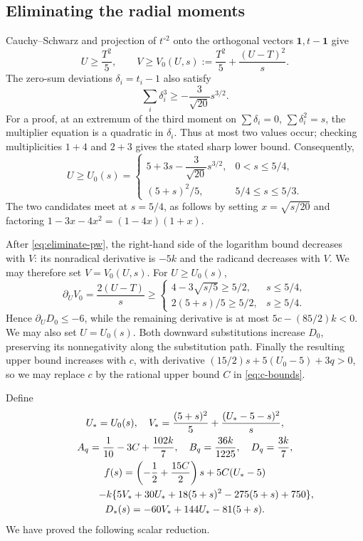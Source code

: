 \documentclass[11pt]{article}
\theoremstyle{remark}
\newcommand{\one}{\mathbf 1}
\numberwithin{equation}{section}
\begin{document}
\subsection{Eliminating the radial moments}
Cauchy--Schwarz and projection of $t^{\circ2}$ onto the orthogonal
vectors $\one,t-\one$ give
\begin{equation}\label{eq:UV}
 U\ge\frac{T^2}{5},\qquad
 V\ge V_0(U,s):=\frac{T^2}{5}+\frac{(U-T)^2}{s}.
\end{equation}
The zero-sum deviations $\delta_i=t_i-1$ also satisfy
\[
 \sum_i\delta_i^3\ge-\frac3{\sqrt{20}}s^{3/2}.
\]
For a proof, at an extremum of the third moment on
$\sum\delta_i=0$, $\sum\delta_i^2=s$, the multiplier equation is a
quadratic in $\delta_i$. Thus at most two values occur; checking
multiplicities $1+4$ and $2+3$ gives the stated sharp lower bound.
Consequently,
\begin{equation}\label{eq:U0}
 U\ge U_0(s)=
 \begin{cases}
 5+3s-\dfrac3{\sqrt{20}}s^{3/2},&0<s\le5/4,\\[2pt]
 (5+s)^2/5,&5/4\le s\le5/3.
 \end{cases}
\end{equation}
The two candidates meet at $s=5/4$, as follows by setting
$x=\sqrt{s/20}$ and factoring
$1-3x-4x^2=(1-4x)(1+x)$.

After \eqref{eq:eliminate-pw}, the right-hand side of the logarithm
bound decreases with $V$: its nonradical derivative is $-5k$ and
the radicand decreases with $V$.
We may therefore set $V=V_0(U,s)$.
For $U\ge U_0(s)$,
\[
 \partial_U V_0=\frac{2(U-T)}s
 \ge\begin{cases}
 4-3\sqrt{s/5}\ge5/2,&s\le5/4,\\
 2(5+s)/5\ge5/2,&s\ge5/4.
 \end{cases}
\]
Hence $\partial_U D_0\le-6$, while the remaining derivative is at most
$5c-(85/2)k<0$. We may also set $U=U_0(s)$.
Both downward substitutions increase $D_0$, preserving its
nonnegativity along the substitution path.
Finally the resulting upper bound increases with $c$, with derivative
$(15/2)s+5(U_0-5)+3q>0$, so we may replace $c$ by the rational upper
bound $C$ in \eqref{eq:c-bounds}.

Define
\begin{equation}\label{eq:scalar-definitions}
\begin{gathered}
 U_*=U_0(s),\quad V_*=\frac{(5+s)^2}{5}
                  +\frac{(U_*-5-s)^2}{s},\\
 A_q=\frac1{10}-3C+\frac{102k}{7},\quad
 B_q=\frac{36k}{1225},\quad D_q=\frac{3k}{7},\\
 f(s)=\left(-\frac12+\frac{15C}{2}\right)s+5C(U_*-5)\\
 \hspace{15mm}-k\{5V_*+30U_*+18(5+s)^2-275(5+s)+750\},\\
 D_*(s)=-60V_*+144U_*-81(5+s).
\end{gathered}
\end{equation}
We have proved the following scalar reduction.
\end{document}
